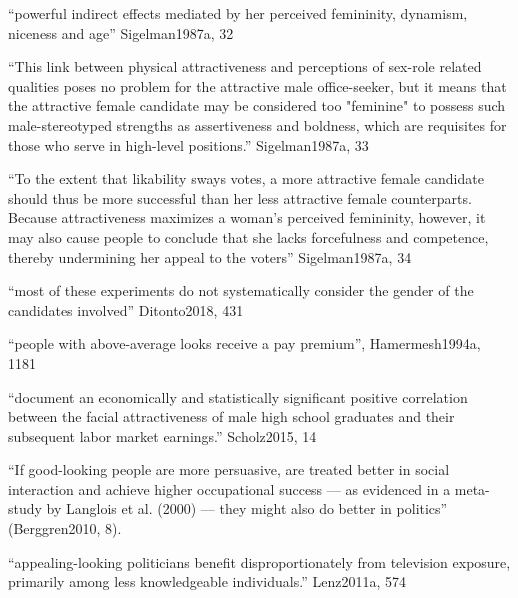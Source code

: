
``powerful indirect effects mediated by her perceived femininity, dynamism, niceness and age'' Sigelman1987a, 32

``This link between physical attractiveness and perceptions of sex-role related qualities poses no problem for the attractive male office-seeker, but it means that the attractive female candidate may be considered too "feminine" to possess such male-stereotyped strengths as assertiveness and boldness, which are requisites for those who serve in high-level positions.''  Sigelman1987a, 33

``To the extent that likability sways votes, a more attractive female candidate should thus be more successful than her less attractive female counterparts. Because attractiveness maximizes a woman's perceived femininity, however, it may also cause people to conclude that she lacks forcefulness and competence, thereby undermining her appeal to the voters''  Sigelman1987a, 34

``most of these experiments do not systematically consider the gender of the candidates involved'' Ditonto2018, 431




		``people with above-average looks receive a pay premium'', Hamermesh1994a, 1181


``document an economically and statistically significant positive correlation between the facial attractiveness of male high school graduates and their subsequent labor market earnings.'' Scholz2015, 14

``If good-looking people are more persuasive, are treated better in social interaction and achieve higher occupational success — as evidenced in a meta-study by Langlois et al. (2000) — they might also do better in politics'' (Berggren2010, 8).



``appealing-looking politicians benefit disproportionately from television exposure, primarily among less knowledgeable individuals.'' Lenz2011a, 574

